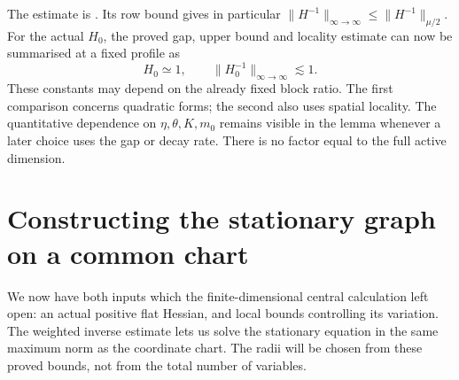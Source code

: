 \documentclass[11pt,reqno]{amsart}
\numberwithin{equation}{section}
\theoremstyle{definition}
\theoremstyle{remark}
\begin{document}
The estimate is \cite[Lemma~14.14 and (14.30), p.~68]{Main}.
Its row bound gives in particular
\(\|H^{-1}\|_{\infty\to\infty}\le\|H^{-1}\|_{\mu/2}\).
For the actual \(H_0\), the proved gap, upper bound and
locality estimate can now be summarised at a fixed profile as
\[
                H_0\simeq1,\qquad
                \|H_0^{-1}\|_{\infty\to\infty}\lesssim1.
\]
These constants may depend on the already fixed block ratio.
The first comparison concerns quadratic forms; the second
also uses spatial locality. The quantitative dependence on
\(\eta,\theta,K,m_0\) remains visible in the lemma whenever
a later choice uses the gap or decay rate. There is no
factor equal to the full active dimension.

\section{Constructing the stationary graph on a common chart}
\label{sec:uniform-stationary}

We now have both inputs which the finite-dimensional central
calculation left open: an actual positive flat Hessian, and local
bounds controlling its variation. The weighted inverse estimate
lets us solve the stationary equation in the same maximum norm
as the coordinate chart. The radii will be chosen from these
proved bounds, not from the total number of variables.
\end{document}
